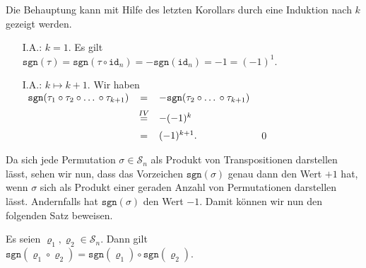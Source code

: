 \proof
Die Behauptung kann mit Hilfe des letzten Korollars durch eine Induktion nach $k$ gezeigt werden.
\begin{enumerate}
\item[I.A.:] $k=1$. Es gilt
             \\[0.2cm]
             \hspace*{1.3cm}
             $\mathtt{sgn}(\tau) = \mathtt{sgn}(\tau \circ \mathtt{id}_n) = -\mathtt{sgn}(\mathtt{id}_n) = -1 = (-1)^1$.
\item[I.A.:] $k \mapsto k+1$. Wir haben
             \\[0.2cm]
             \hspace*{1.3cm}
             $
             \begin{array}[b]{lcl}
               \mathtt{sgn}(\tau_1 \circ \tau_2 \circ \mbox{\dots} \circ \tau_{k+1}) 
               & = & - \mathtt{sgn}(\tau_2 \circ \mbox{\dots} \circ \tau_{k+1}) \\[0.2cm]
               & \stackrel{IV}{=} & - (-1)^k \\[0.2cm]
               & = & (-1)^{k+1}.
             \end{array}
             $ \qed             
\end{enumerate}

Da sich jede Permutation $\sigma \in \mathcal{S}_n$ als Produkt von Transpositionen darstellen l\"asst,
sehen wir nun, dass das Vorzeichen $\mathtt{sgn}(\sigma)$ genau dann den Wert $+1$ hat, wenn $\sigma$ sich
als Produkt einer geraden Anzahl von Permutationen darstellen l\"asst.  Andernfalls hat $\mathtt{sgn}(\sigma)$
den Wert $-1$.  Damit k\"onnen wir nun den folgenden Satz beweisen.

\begin{Satz} \label{satz:signum}
Es seien $\varrho_1, \varrho_2 \in \mathcal{S}_n$.  Dann gilt
\\[0.2cm]
\hspace*{1.3cm}
$\mathtt{sgn}(\varrho_1 \circ \varrho_2) =\mathtt{sgn}(\varrho_1) \circ \mathtt{sgn}(\varrho_2)$.
\end{Satz}

